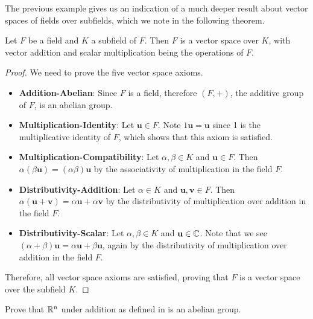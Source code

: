 The previous example gives us an indication of a much deeper result about vector spaces of fields over subfields, which we note in the following theorem.

\begin{theorem}\label{thrm-field-is-vector-space}
    Let $F$ be a field and $K$ a subfield of $F$. Then $F$ is a vector space over $K$, with vector addition and scalar multiplication being the operations of $F$.
\end{theorem}
\begin{proof}
    We need to prove the five vector space axioms.
    \begin{itemize}
        \item \textbf{Addition-Abelian}: Since $F$ is a field, therefore $(F, +)$, the additive group of $F$, is an abelian group.

        \item \textbf{Multiplication-Identity}: Let $\mathbf{u} \in F$. Note $1\mathbf{u} = \mathbf{u}$ since 1 is the multiplicative identity of $F$, which shows that this axiom is satisfied.

        \item \textbf{Multiplication-Compatibility}: Let $\alpha, \beta \in K$ and $\mathbf{u} \in F$. Then $\alpha(\beta\mathbf{u}) = (\alpha\beta)\mathbf{u}$ by the associativity of multiplication in the field $F$.

        \item \textbf{Distributivity-Addition}: Let $\alpha \in K$ and $\mathbf{u}, \mathbf{v} \in F$. Then $\alpha(\mathbf{u} + \mathbf{v}) = \alpha\mathbf{u} + \alpha\mathbf{v}$ by the distributivity of multiplication over addition in the field $F$.

        \item \textbf{Distributivity-Scalar}: Let $\alpha, \beta \in K$ and $\mathbf{u} \in \mathbb{C}$. Note that we see $(\alpha+\beta)\mathbf{u} = \alpha\mathbf{u} + \beta\mathbf{u}$, again by the distributivity of multiplication over addition in the field $F$.
    \end{itemize}

    Therefore, all vector space axioms are satisfied, proving that $F$ is a vector space over the subfield $K$.
\end{proof}

\begin{exercise}\label{exercise-R^n-is-abelian-group}
    Prove that $\mathbb{R}^n$ under addition as defined in  is an abelian group.
\end{exercise}

